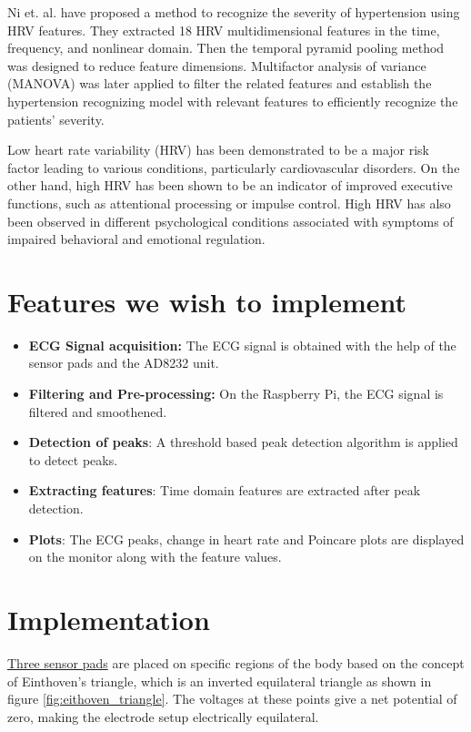 \documentclass[11pt]{article}
\theoremstyle{definition}
\begin{document}
  Ni et. al.\cite{ni2019multiscale} have proposed a method to recognize the severity of hypertension using HRV features. They extracted 18 HRV multidimensional features in the time, frequency, and nonlinear domain. Then the temporal pyramid pooling method was designed to reduce feature dimensions. Multifactor analysis of variance (MANOVA) was later applied to filter the related features and establish the hypertension recognizing model with relevant features to efficiently recognize the patients’ severity.

  Low heart rate variability (HRV) has been demonstrated to be a major risk factor leading to various conditions, particularly cardiovascular disorders\cite{kamath1987heart}.
  On the other hand, high HRV has been shown to be an indicator of improved executive functions, such as attentional processing or impulse control\cite{appelhans2006heart, thayer2005psychosomatics}.
  High HRV has also been observed in different psychological conditions associated with symptoms of impaired behavioral and emotional regulation\cite{thayer2009claude, schulz2008negative}.


  \section{Features we wish to implement}
  \begin{itemize}
    \item \textbf{ECG Signal acquisition:} The ECG signal is obtained with the help of the sensor pads and the AD8232 unit.
    \item \textbf{Filtering and Pre-processing:} On the Raspberry Pi, the ECG signal is filtered and smoothened.
    \item \textbf{Detection of peaks}: A threshold based peak detection algorithm is applied to detect peaks.
    \item \textbf{Extracting features}: Time domain features are extracted after peak detection.
    \item \textbf{Plots}: The ECG peaks, change in heart rate and Poincare plots are displayed on the monitor along with the feature values.
  \end{itemize}

  \section{Implementation}
  \underline{Three sensor pads} are placed on specific regions of the body based on the concept of Einthoven’s triangle\cite{abi2019einthoven}, which is an inverted equilateral triangle as shown in figure \ref{fig:eithoven_triangle}. The voltages at these points give a net potential of zero, making the electrode setup electrically equilateral.
\end{document}
